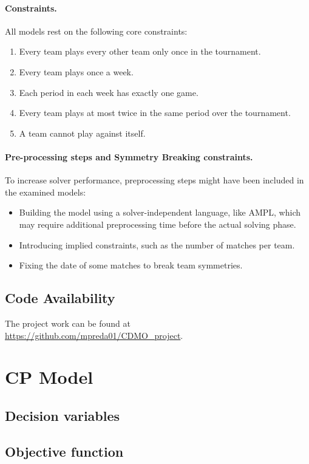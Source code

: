 \documentclass{article}
\begin{document}
\paragraph{Constraints.}
All models rest on the following core constraints:
\begin{enumerate}
    \item Every team plays every other team only once in the tournament.
    \item Every team plays once a week.
    \item Each period in each week has exactly one game.
    \item Every team plays at most twice in the same period over the tournament.
    \item A team cannot play against itself.
\end{enumerate}

\paragraph{Pre-processing steps and Symmetry Breaking constraints.}
To increase solver performance, preprocessing steps might have been included in the examined models:
\begin{itemize}
    \item Building the model using a solver-independent language, like AMPL, which may require additional preprocessing time before the actual solving phase.
    \item Introducing implied constraints, such as the number of matches per team.
    \item Fixing the date of some matches to break team symmetries.
\end{itemize}

\subsection{Code Availability}
The project work can be found at \url{https://github.com/mpreda01/CDMO_project}.


\section{CP Model}

\subsection{Decision variables}

\subsection{Objective function}
\end{document}
